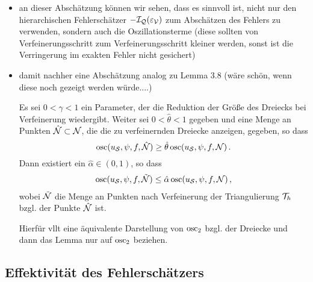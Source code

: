 \begin{itemize}
\item an dieser Abschätzung können wir sehen, dass es sinnvoll ist, nicht nur den hierarchischen Fehlerschätzer $-\mathcal I_{\mathcal Q}(\varepsilon_{\mathcal V})$ zum Abschätzen des Fehlers zu verwenden, sondern auch die Oszillationsterme (diese sollten von Verfeinerungsschritt zum Verfeinerungsschritt kleiner werden, sonst ist die Verringerung im exakten Fehler nicht gesichert)

\item damit nachher eine Abschätzung analog zu \cite{MorNoc} Lemma 3.8 (wäre schön, wenn diese noch gezeigt werden würde....)
\begin{lemma}
Es sei $0 < \gamma < 1$ ein Parameter, der die Reduktion der Größe des Dreiecks bei Verfeinerung wiedergibt. Weiter sei $0 < \hat \theta < 1$ gegeben und eine Menge an Punkten $\hat{\mathcal N}\subset \mathcal N$, die die zu verfeinernden Dreiecke anzeigen, gegeben, so dass
\[
	\operatorname{osc}(u_{\mathcal S},\psi,f,\hat{\mathcal N}) \ge \hat\theta \operatorname{osc} (u_{\mathcal S},\psi,f,\mathcal N) \, .
\]
Dann existiert ein $\hat\alpha \in (0,1)$, so dass
\begin{align}
	\operatorname{osc}(u_{\mathcal S},\psi,f,\tilde{\mathcal N}) \le \hat \alpha \operatorname{osc} (u_{\mathcal S},\psi,f,\mathcal N) \, ,
\end{align}
wobei $\tilde{\mathcal N}$ die Menge an Punkten nach Verfeinerung der Triangulierung $\mathcal T_h$ bzgl. der Punkte $\hat{\mathcal N}$ ist.
\end{lemma}

Hierfür vllt eine äquivalente Darstellung von $\operatorname{osc}_2$ bzgl. der Dreiecke und dann das Lemma nur auf $\operatorname{osc}_2$ beziehen.
\end{itemize}






\subsection{Effektivität des Fehlerschätzers}
\label{kap:4.1.5}

